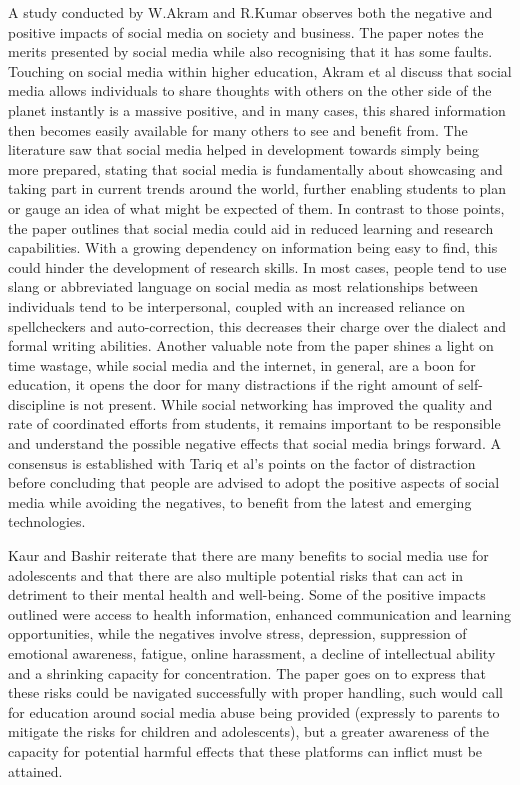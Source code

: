 \documentclass[lettersize,journal]{IEEEtran}
\begin{document}
    A study conducted by W.Akram and R.Kumar \cite{Akram et al 2017} observes both the negative
    and positive impacts of social media on society and business.  The paper notes the merits presented by social media
    while also recognising that it has some faults. Touching on social media within higher education, Akram et al
    discuss that social media allows individuals to share thoughts with others on the other side of the planet instantly
    is a massive positive, and in many cases, this shared information then becomes easily available for many others to
    see and benefit from. The literature saw that social media helped in development towards simply being more prepared, stating that
    social media is fundamentally about showcasing and taking part in  current trends around the world, further enabling students
    to plan or gauge an idea of what might be expected of them. In contrast to those points, the paper outlines that
    social media could aid in reduced learning and research capabilities. With a growing dependency on information
    being easy to find, this could hinder the development of research skills. In most cases, people tend to use slang or
    abbreviated language on social media as most relationships between individuals tend to be interpersonal, coupled
    with an increased reliance on spellcheckers and auto-correction, this decreases their charge over the dialect and
    formal writing abilities. Another valuable note from the paper shines a light on time wastage, while social media
    and the internet, in general, are a boon for education, it opens the door for many distractions if the right amount
   of self-discipline is not present. While social networking has improved the quality and rate of coordinated
    efforts from students, it remains important to be responsible and understand the possible negative effects
    that social media brings forward. A consensus is established with Tariq et al's \cite{Tariq et al 2012}
    points on the factor of distraction before concluding that people are advised to adopt the positive aspects of
    social media while avoiding the negatives, to benefit from the latest and emerging technologies.

    Kaur and Bashir \cite{Bashir et al 2015} reiterate that there are many benefits to social media use
    for adolescents and that there are also multiple potential risks that can act in detriment to their
    mental health and well-being. Some of the positive impacts outlined were access to health information,
    enhanced communication and learning opportunities, while the negatives involve stress, depression,
    suppression of emotional awareness, fatigue, online harassment, a decline of intellectual ability
    and a shrinking capacity for concentration. The paper goes on to express that these risks could be
    navigated successfully with proper handling, such would call for education around social media abuse
    being provided (expressly to parents to mitigate the risks for children and adolescents), but a greater
    awareness of the capacity for potential harmful effects that these platforms can inflict must be attained.
\end{document}
